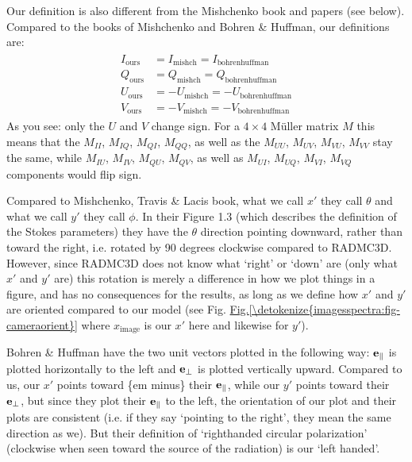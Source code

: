 \documentclass[letterpaper,10pt,english]{sphinxmanual}
\begin{document}
Our definition is also different from the Mishchenko book and papers (see
below). Compared to the books of Mishchenko and Bohren \& Huffman, our
definitions are:
\begin{equation*}
\begin{split}\begin{split}
I_{\mathrm{ours}} &=  I_{\mathrm{mishch}}  = I_{\mathrm{bohrenhuffman}} \\
Q_{\mathrm{ours}} &=  Q_{\mathrm{mishch}}  = Q_{\mathrm{bohrenhuffman}} \\
U_{\mathrm{ours}} &=  -U_{\mathrm{mishch}} = -U_{\mathrm{bohrenhuffman}} \\
V_{\mathrm{ours}} &=  -V_{\mathrm{mishch}} = -V_{\mathrm{bohrenhuffman}}
\end{split}\end{split}
\end{equation*}
As you see: only the \(U\) and \(V\) change sign. For a \(4\times 4\)
Müller matrix \(M\) this means that the \(M_{II}\), \(M_{IQ}\),
\(M_{QI}\), \(M_{QQ}\), as well as the \(M_{UU}\), \(M_{UV}\),
\(M_{VU}\), \(M_{VV}\) stay the same, while \(M_{IU}\),
\(M_{IV}\), \(M_{QU}\), \(M_{QV}\), as well as \(M_{UI}\),
\(M_{UQ}\), \(M_{VI}\), \(M_{VQ}\) components would flip sign.

Compared to Mishchenko, Travis \& Lacis book, what we call \(x'\) they call
\(\theta\) and what we call \(y'\) they call \(\phi\). In their
Figure 1.3 (which describes the definition of the Stokes parameters) they have
the \(\theta\) direction pointing downward, rather than toward the right,
i.e. rotated by 90 degrees clockwise compared to RADMC\sphinxhyphen{}3D. However, since
RADMC\sphinxhyphen{}3D does not know what ‘right’ or ‘down’ are (only what \(x'\) and
\(y'\) are) this rotation is merely a difference in how we plot things in a
figure, and has no consequences for the results, as long as we define how
\(x'\) and \(y'\) are oriented compared to our model (see
Fig. \hyperref[\detokenize{imagesspectra:fig-cameraorient}]{Fig.\@ \ref{\detokenize{imagesspectra:fig-cameraorient}}} where \(x_{\mathrm{image}}\) is our \(x'\)
here and likewise for \(y'\)).

Bohren \& Huffman have the two unit vectors plotted in the following way:
\({\bf e}_{\parallel}\) is plotted horizontally to the left and \({\bf
e}_{\perp}\) is plotted vertically upward. Compared to us, our \(x'\) points
toward \{em minus\} their \({\bf e}_{\parallel}\), while our \(y'\)
points toward their \({\bf e}_{\perp}\), but since they plot their
\({\bf e}_{\parallel}\) to the left, the orientation of our plot and their
plots are consistent (i.e. if they say ‘pointing to the right’, they mean the
same direction as we). But their definition of ‘right\sphinxhyphen{}handed circular
polarization’ (clockwise when seen toward the source of the radiation) is our
‘left handed’.
\end{document}
